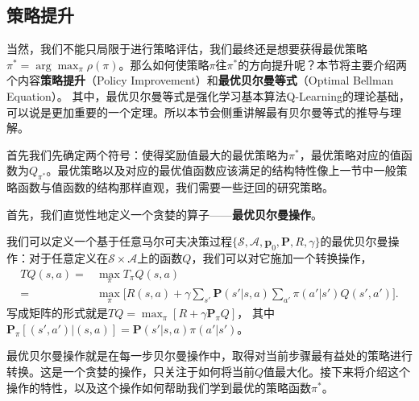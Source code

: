\subsection{策略提升}

当然，我们不能只局限于进行策略评估，我们最终还是想要获得最优策略 $\pi^* = \arg\max_\pi \rho(\pi)$。那么如何使策略$\pi$往$\pi^*$的方向提升呢？本节将主要介绍两个内容\textbf{策略提升}（Policy Improvement）和\textbf{最优贝尔曼等式}（Optimal Bellman Equation）。 其中，最优贝尔曼等式是强化学习基本算法Q-Learning的理论基础，可以说是更加重要的一个定理。所以本节会侧重讲解最有贝尔曼等式的推导与理解。

首先我们先确定两个符号：使得奖励值最大的最优策略为$\pi^*$，最优策略对应的值函数为$Q_{\pi^*}$。最优策略以及对应的最优值函数应该满足的结构特性像上一节中一般策略函数与值函数的结构那样直观，我们需要一些迂回的研究策略。

首先，我们直觉性地定义一个贪婪的算子——\textbf{最优贝尔曼操作}。
\begin{definition}
    我们可以定义一个基于任意马尔可夫决策过程$\{\mathcal{S}, \mathcal{A}, \mathbf{p}_0, \mathbf{P}, R, \gamma\}$的最优贝尔曼操作：对于任意定义在$\mathcal{S}\times\mathcal{A}$上的函数$Q$，我们可以对它施加一个转换操作，
    \begin{equation}
        \begin{aligned}
            TQ(s, a) =& \max_{\pi} T_\pi Q(s, a)\\
            =& \max_{\pi}\bigg[ R(s, a) + \gamma \sum_{s'} \mathbf{P}(s' \vert s, a)
            \sum_{a'} \pi(a' \vert s') Q(s', a')\bigg].
        \end{aligned}
    \end{equation}
    写成矩阵的形式就是$TQ = \max_\pi [R + \gamma \mathbf{P}_{\pi} Q]$， 其中$\mathbf{P}_{\pi}[(s', a') \vert (s, a)] = \mathbf{P}(s' \vert s, a) \pi(a' \vert s')$。
\end{definition}
最优贝尔曼操作就是在每一步贝尔曼操作中，取得对当前步骤最有益处的策略进行转换。这是一个贪婪的操作，只关注于如何将当前$Q$值最大化。接下来将介绍这个操作的特性，以及这个操作如何帮助我们学到最优的策略函数$\pi^*$。

